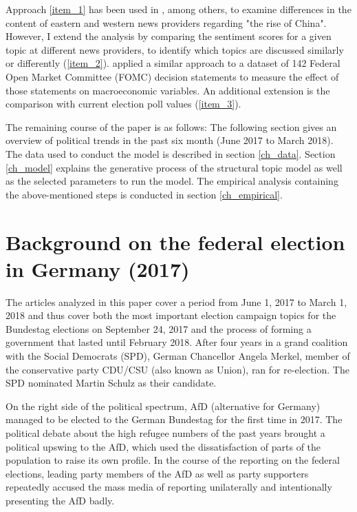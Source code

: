 \documentclass[12pt,a4paper,notitlepage]{article}
\begin{document}
Approach \ref{item_1} has been used in \citet{roberts_model_2016}, among others, to examine differences in the content of eastern and western news providers regarding "the rise of China". However, I extend the analysis by comparing the sentiment scores for a given topic at different news providers, to identify which topics are discussed similarly or differently (\ref{item_2}). \citet{hansen_shocking_2016} applied a similar approach to a dataset of 142 Federal Open Market Committee (FOMC) decision statements to measure the effect of those statements on macroeconomic variables. An additional extension is the comparison with current election poll values (\ref{item_3}).

The remaining course of the paper is as follows: The following section gives an overview of political trends in the past six month (June 2017 to March 2018). The data used to conduct the model is described in section \ref{ch_data}. Section \ref{ch_model} explains the generative process of the structural topic model as well as the selected parameters to run the model. The empirical analysis containing the above-mentioned steps is conducted in section \ref{ch_empirical}. 
 
\section{Background on the federal election in Germany (2017)}\label{ch_elections}


The articles analyzed in this paper cover a period from June 1, 2017 to March 1, 2018 and thus cover both the most important election campaign topics for the Bundestag elections on September 24, 2017 and the process of forming a government that lasted until February 2018. After four years in a grand coalition with the Social Democrats (SPD), German Chancellor Angela Merkel, member of the conservative party CDU/CSU (also known as Union), ran for re-election. The SPD nominated Martin Schulz as their candidate. 

On the right side of the political spectrum, AfD (alternative for Germany) managed to be elected to the German Bundestag for the first time in 2017. The political debate about the high refugee numbers of the past years brought a political upswing to the AfD, which used the dissatisfaction of parts of the population to raise its own profile. In the course of the reporting on the federal elections, leading party members of the AfD as well as party supporters repeatedly accused the mass media of reporting unilaterally and intentionally presenting the AfD badly.
\end{document}
